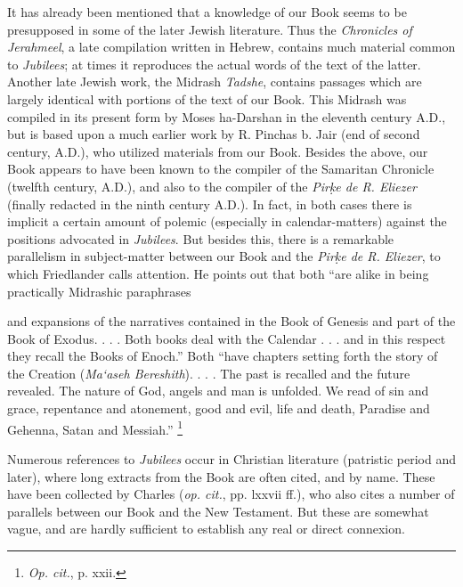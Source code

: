 It has already been mentioned that a knowledge of our Book seems to be presupposed in some of the later Jewish literature. Thus the \emph{Chronicles of Jerahmeel}, a late compilation written in Hebrew, contains much material common to \emph{Jubilees}; at times it reproduces the actual words of the text of the latter. Another late Jewish work, the Midrash \emph{Tadshe}, contains passages which are largely identical with portions of the text of our Book. This Midrash was compiled in its present form by Moses ha-Darshan in the eleventh century A.D., but is based upon a much earlier work by R. Pinchas b. Jair (end of second century, A.D.), who utilized materials from our Book. Besides the above, our Book appears to have been known to the compiler of the Samaritan Chronicle (twelfth century, A.D.), and also to the compiler of the \emph{Pir\d{k}e de R. Eliezer} (finally redacted in the ninth century A.D.). In fact, in both cases there is implicit a certain amount of polemic (especially in calendar-matters) against the positions advocated in \emph{Jubilees}. But besides this, there is a remarkable parallelism in subject-matter between our Book and the \emph{Pir\d{k}e de R. Eliezer}, to which Friedlander calls attention. He points out that both ``are alike in being practically Midrashic paraphrases

and expansions of the narratives contained in the Book of Genesis and part of the Book of Exodus. . . . Both books deal with the Calendar . . . and in this respect they recall the Books of Enoch.'' Both ``have chapters setting forth the story of the Creation (\emph{Ma‘aseh Bereshith}). . . . The past is recalled and the future revealed. The nature of God, angels and man is unfolded. We read of sin and grace, repentance and atonement, good and evil, life and death, Paradise and Gehenna, Satan and Messiah.'' \footnote{\emph{Op. cit.}, p. xxii.}

Numerous references to \emph{Jubilees} occur in Christian literature (patristic period and later), where long extracts from the Book are often cited, and by name. These have been collected by Charles (\emph{op. cit.}, pp. lxxvii ff.), who also cites a number of parallels between our Book and the New Testament. But these are somewhat vague, and are hardly sufficient to establish any real or direct connexion.


